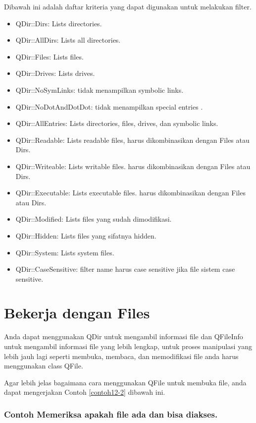 Dibawah ini adalah daftar kriteria yang dapat digunakan untuk melakukan
filter.

\begin{itemize}

\item
  QDir::Dirs: Lists directories.
\item
  QDir::AllDirs: Lists all directories.
\item
  QDir::Files: Lists files.
\item
  QDir::Drives: Lists drives.
\item
  QDir::NoSymLinks: tidak menampilkan symbolic links.
\item
  QDir::NoDotAndDotDot: tidak menampilkan special entries .
\item
  QDir::AllEntries: Lists directories, files, drives, dan symbolic
  links.
\item
  QDir::Readable: Lists readable files, harus dikombinasikan dengan
  Files atau Dirs.
\item
  QDir::Writeable: Lists writable files. harus dikombinasikan dengan
  Files atau Dirs.
\item
  QDir::Executable: Lists executable files. harus dikombinasikan dengan
  Files atau Dirs.
\item
  QDir::Modified: Lists files yang sudah dimodifikasi.
\item
  QDir::Hidden: Lists files yang sifatnya hidden.
\item
  QDir::System: Lists system files.
\item
  QDir::CaseSensitive: filter name harus case sensitive jika file sistem
  case sensitive.
\end{itemize}

\section{Bekerja dengan Files}\label{bekerja-dengan-files}

Anda dapat menggunakan QDir untuk mengambil informasi file dan QFileInfo
untuk mengambil informasi file yang lebih lengkap, untuk proses
manipulasi yang lebih jauh lagi seperti membuka, membaca, dan
memodifikasi file anda harus menggunakan class QFile.

Agar lebih jelas bagaimana cara menggunakan QFile untuk membuka file,
anda dapat mengerjakan Contoh \ref{contoh12-2} dibawah ini.

\subsubsection*{Contoh  Memeriksa apakah file ada dan bisa diakses.}

